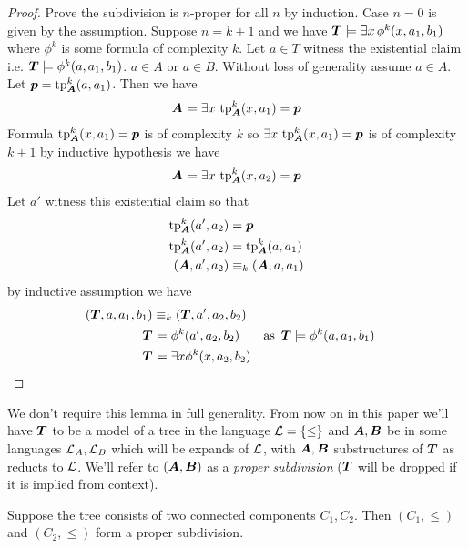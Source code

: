 \documentclass{amsart}
\DeclareMathOperator{\TT}{\boldface T}
\DeclareMathOperator{\A}{\boldface A}
\DeclareMathOperator{\B}{\boldface B}
\begin{document}
\begin{proof}
	Prove the subdivision is $n$-proper for all $n$ by induction. Case $n = 0$ is given by the assumption. Suppose $n = k + 1$ and we have $\TT \models \exists x \, \phi^k(x, a_1, b_1)$ where $\phi^k$ is some formula of complexity $k$. Let $a \in T$ witness the existential claim i.e. $\TT \models \phi^k(a, a_1, b_1)$. $a \in A$ or $a \in B$. Without loss of generality assume $a \in A$. Let $\pp = \tp^k_{\A} (a, a_1)$. Then we have 
	\begin{align*}
		\A \models \exists x \, \tp^k_{\A}(x, a_1) = \pp
	\end{align*}
	Formula $\tp^k_{\A}(x, a_1) = \pp$ is of complexity $k$ so $\exists x \, \tp^k_{\A}(x, a_1) = \pp$ is of complexity $k+1$ by inductive hypothesis we have
	\begin{align*}
		\A \models \exists x \, \tp^k_{\A}(x, a_2) = \pp
	\end{align*}
	Let $a'$ witness this existential claim so that  
	\begin{align*}
		\tp^k_{\A}(a', a_2) &= \pp \\
		\tp^k_{\A}(a', a_2) &= \tp^k_{\A}(a, a_1) \\
		(\A, a', a_2) &\equiv_k (\A, a, a_1)
	\end{align*}
	by inductive assumption we have
	\begin{align*}
		(\TT, a, a_1, b_1) &\equiv_k (\TT, a', a_2, b_2) \\
		\TT &\models \phi^k(a', a_2, b_2) & \text {as } \TT &\models \phi^k(a, a_1, b_1)\\
		\TT &\models \exists x \phi^k(x, a_2, b_2)
	\end{align*}
\end{proof}

We don't require this lemma in full generality. From now on in this paper we'll have $\TT$ to be a model of a tree in the language $\mathcal L = \{\leq\}$ and $\A, \B$ be in some languages $\mathcal L_A, \mathcal L_B$ which will be expands of $\mathcal L$, with $\A, \B$ substructures of $\TT$ as reducts to $\mathcal L$. We'll refer to $(\A, \B)$ as a \emph{proper subdivision} ($\TT$ will be dropped if it is implied from context).

\begin{Example}
	Suppose the tree consists of two connected components $C_1, C_2$. Then $(C_1, \leq)$ and $(C_2, \leq)$ form a proper subdivision.
\end{Example}
\end{document}
